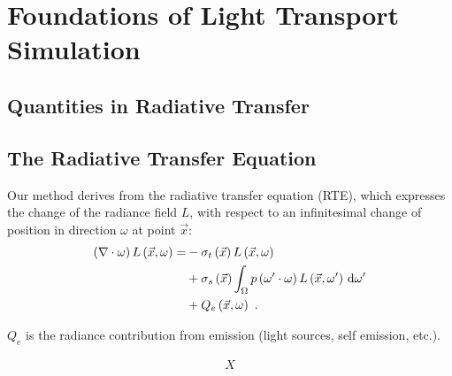 \chapter{Foundations of Light Transport Simulation}
\label{sec:foundations}

\section{Quantities in Radiative Transfer}


\section{The Radiative Transfer Equation}

Our method derives from the radiative transfer equation (RTE), which expresses the change of the radiance field $L$, with respect to an infinitesimal change of position in direction $\omega$ at point $\vec{x}$:
\begin{align}
\left(\nabla\cdot\omega\right)L\left(\vec{x}, \omega \right)
=&
-\sigma_t\left(\vec{x}\right) L\left(\vec{x}, \omega \right)\nonumber\\
&
+\sigma_s\left(\vec{x}\right) \int_{\Omega}
{
p\left(\omega'\cdot\omega\right)L\left(\vec{x}, \omega' \right)\,\mathrm{d}\omega'
}
\label{eq:rte}
\\
&
+Q_e\left(\vec{x}, \omega\right)
\nonumber
\  .
\end{align}

$Q_e$ is the radiance contribution from emission (light sources, self emission, etc.).



\begin{align}
\label{eq:foundations_mean_cosine}
X
\end{align}



